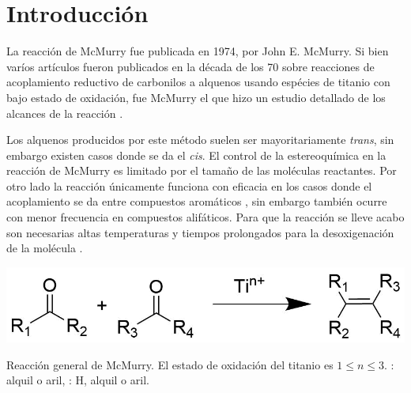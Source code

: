 \documentclass[fleqn,11pt]{SelfArx}
\begin{document}
\flushbottom %

\maketitle %


\thispagestyle{empty} %


\section*{Introducci\'on} %

La reacci\'on de McMurry fue publicada en 1974, por John E. McMurry. Si bien var\'ios art\'iculos fueron publicados en la d\'ecada de los 70 \cite{Mukaiyama1973, Mukaiyama1974} sobre reacciones de acoplamiento reductivo de carbonilos a alquenos usando esp\'ecies de titanio con bajo estado de oxidaci\'on, fue McMurry el que hizo un estudio detallado de los alcances de la reacci\'on \cite{Wang2010}.

Los alquenos producidos por este m\'etodo suelen ser mayoritariamente \textit{trans}, sin embargo existen casos donde se da el \textit{cis}. El control de la estereoqu\'imica en la reacci\'on de McMurry es limitado por el tama\~no de las mol\'eculas reactantes. Por otro lado la reacci\'on \'unicamente funciona con eficacia en los casos donde el acoplamiento se da entre compuestos arom\'aticos \cite{Wang2010}, sin embargo tambi\'en ocurre con menor frecuencia en compuestos alif\'aticos. Para que la reacci\'on se lleve acabo son necesarias altas temperaturas y tiempos prolongados para la desoxigenaci\'on de la mol\'ecula \cite{Wang2010, Villiers1997}.

\begin{scheme}[h]
	\centering
	\includegraphics[width=0.9\linewidth]{structures/generalreaction.png}
	\caption{Reacci\'on general de McMurry. El estado de oxidaci\'on del titanio es $1\leq n\leq3$. : alquil o aril, : H, alquil o aril. \cite{Wang2010}}
\end{scheme}
\end{document}
